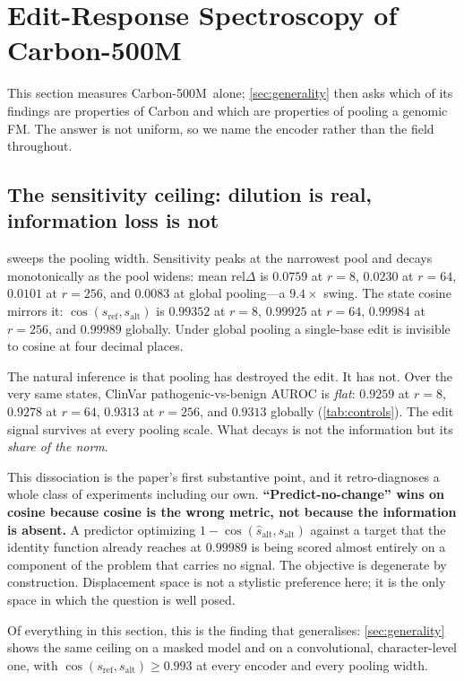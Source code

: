 \documentclass{article}
\newcommand{\sref}{s_{\mathrm{ref}}}
\newcommand{\salt}{s_{\mathrm{alt}}}
\newcommand{\D}{\Delta}
\newcommand{\carbon}{Carbon-500M\xspace}
\begin{document}
\section{Edit-Response Spectroscopy of \carbon}
\label{sec:spectroscopy}

This section measures \carbon\ alone; \cref{sec:generality} then asks which of its findings are
properties of Carbon and which are properties of pooling a genomic FM. The answer is not uniform, so
we name the encoder rather than the field throughout.

\subsection{The sensitivity ceiling: dilution is real, information loss is not}
\label{sec:ceiling}

 sweeps the pooling width. Sensitivity peaks at the narrowest pool and decays
monotonically as the pool widens: mean $\mathrm{rel}\D$ is $0.0759$ at $r{=}8$, $0.0230$ at
$r{=}64$, $0.0101$ at $r{=}256$, and $0.0083$ at global pooling---a $9.4\times$ swing. The state
cosine mirrors it: $\cos(\sref,\salt)$ is $0.99352$ at $r{=}8$, $0.99925$ at $r{=}64$, $0.99984$ at
$r{=}256$, and $0.99989$ globally. Under global pooling a single-base edit is invisible to cosine at
four decimal places.

The natural inference is that pooling has destroyed the edit. It has not. Over the very same states,
ClinVar pathogenic-vs-benign AUROC is \emph{flat}: $0.9259$ at $r{=}8$, $0.9278$ at $r{=}64$,
$0.9313$ at $r{=}256$, and $0.9313$ globally (\cref{tab:controls}). The edit signal survives at
every pooling scale. What decays is not the information but its \emph{share of the norm}.

This dissociation is the paper's first substantive point, and it retro-diagnoses a whole class of
experiments including our own. \textbf{``Predict-no-change'' wins on cosine because cosine is the
wrong metric, not because the information is absent.} A predictor optimizing
$1-\cos(\hat s_{\mathrm{alt}},\salt)$ against a target that the identity function already reaches at
$0.99989$ is being scored almost entirely on a component of the problem that carries no signal. The
objective is degenerate by construction. Displacement space is not a stylistic preference here; it
is the only space in which the question is well posed.

Of everything in this section, this is the finding that generalises: \cref{sec:generality} shows the
same ceiling on a masked model and on a convolutional, character-level one, with
$\cos(\sref,\salt)\ge0.993$ at every encoder and every pooling width.
\end{document}
